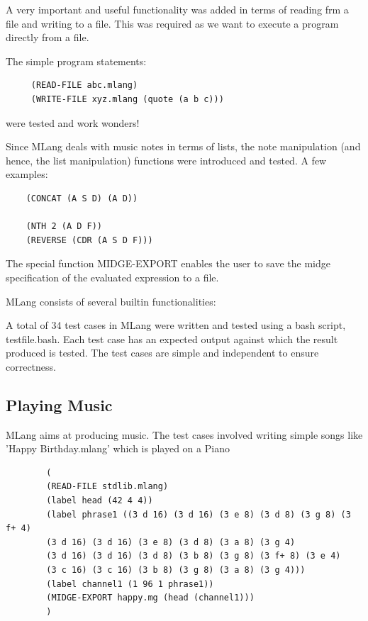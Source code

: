 \documentclass[letterpaper,11pt]{article}
\begin{document}
{\begin{lstlisting}
\end{lstlisting}
A very important and useful functionality was added in terms of reading frm a file and writing to a file. This was required as we want to execute a program directly from a file.

The simple program statements:

\lstset{language=Lisp}
\begin{lstlisting}
	 (READ-FILE abc.mlang) 
	 (WRITE-FILE xyz.mlang (quote (a b c))) 

\end{lstlisting}
were tested and work wonders!

Since MLang deals with music notes in terms of lists, the note manipulation (and hence, the list manipulation) functions were introduced and tested. 
A few examples:

\lstset{language=Lisp}
\begin{lstlisting}
	(CONCAT (A S D) (A D))

	(NTH 2 (A D F))
	(REVERSE (CDR (A S D F)))

\end{lstlisting}

The special function MIDGE-EXPORT enables the user to save the midge specification of the evaluated expression to a file.

MLang consists of several builtin functionalities:

A total of 34 test cases in MLang were written and tested using a bash script, testfile.bash. Each test case has an expected output against which the result produced is tested. The test cases are simple and independent to ensure correctness. 

\subsection{Playing Music}

MLang aims at producing music. The test cases involved writing simple songs like 'Happy Birthday.mlang' which is played on a Piano
		
\lstset{language=Lisp}
\begin{lstlisting}
		(
		(READ-FILE stdlib.mlang)
		(label head (42 4 4))
		(label phrase1 ((3 d 16) (3 d 16) (3 e 8) (3 d 8) (3 g 8) (3 f+ 4)
		(3 d 16) (3 d 16) (3 e 8) (3 d 8) (3 a 8) (3 g 4)
		(3 d 16) (3 d 16) (3 d 8) (3 b 8) (3 g 8) (3 f+ 8) (3 e 4)		
		(3 c 16) (3 c 16) (3 b 8) (3 g 8) (3 a 8) (3 g 4)))
		(label channel1 (1 96 1 phrase1))
		(MIDGE-EXPORT happy.mg (head (channel1)))
		)


\end{lstlisting}}
\end{document}
